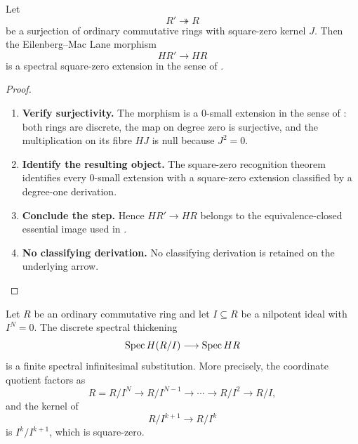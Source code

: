 \begin{lemma}
\label{lem:discrete-square-zero-recognition}
Let
\[
    R'\twoheadrightarrow R
\]
be a surjection of ordinary commutative rings with square-zero kernel \(J\).
Then the Eilenberg--Mac Lane morphism
\[
    HR'\longrightarrow HR
\]
is a spectral square-zero extension in the sense of
.
\end{lemma}

\begin{proof}
\leavevmode
\begin{enumerate}[label=\textup{(\arabic*)}]
    \item \textbf{Verify surjectivity.}
    The morphism is a \(0\)-small extension in the sense of \cite[Definition~3.12 and
    Remark~3.16]{LurieDAGIV}: both rings are discrete, the map on degree zero is surjective, and
    the multiplication on its fibre \(HJ\) is null because \(J^2=0\).

    \item \textbf{Identify the resulting object.}
    The square-zero recognition theorem \cite[Theorem~3.17]{LurieDAGIV} identifies every
    \(0\)-small extension with a square-zero extension classified by a degree-one
    derivation.

    \item \textbf{Conclude the step.}
    Hence \(HR'\to HR\) belongs to the equivalence-closed essential image used in
    .

    \item \textbf{No classifying derivation.}
    No classifying derivation is retained on the underlying arrow.
\end{enumerate}
\end{proof}

\begin{proposition}
\label{prop:discrete-nilpotent-finite-square-zero}
Let \(R\) be an ordinary commutative ring and let \(I\subseteq R\) be a
nilpotent ideal with \(I^N=0\). The discrete spectral thickening
\[
    \operatorname{Spec} H(R/I)\longrightarrow\operatorname{Spec} HR
\]
is a finite spectral infinitesimal substitution. More precisely, the
coordinate quotient factors as
\[
    R=R/I^N\longrightarrow R/I^{N-1}\longrightarrow\cdots
    \longrightarrow R/I^2\longrightarrow R/I,
\]
and the kernel of
\[
    R/I^{k+1}\longrightarrow R/I^k
\]
is \(I^k/I^{k+1}\), which is square-zero.
\end{proposition}


